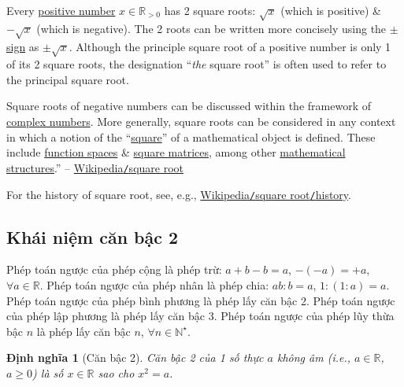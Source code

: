\documentclass{article}
\newtheorem{dinhnghia}{Định nghĩa}
\begin{document}
Every \href{https://en.wikipedia.org/wiki/Positive_number}{positive number} $x\in\mathbb{R}_{> 0}$ has 2 square roots: $\sqrt{x}$ (which is positive) \& $-\sqrt{x}$ (which is negative). The 2 roots can be written more concisely using the \href{https://en.wikipedia.org/wiki/Plus%E2%80%93minus_sign}{$\pm$ sign} as $\pm\sqrt{x}$. Although the principle square root of a positive number is only 1 of its 2 square roots, the designation ``\textit{the} square root'' is often used to refer to the principal square root.

Square roots of negative numbers can be discussed within the framework of \href{https://en.wikipedia.org/wiki/Complex_number}{complex numbers}. More generally, square roots can be considered in any context in which a notion of the ``\href{https://en.wikipedia.org/wiki/Square_(algebra)}{square}'' of a mathematical object is defined. These include \href{https://en.wikipedia.org/wiki/Function_space}{function spaces} \& \href{https://en.wikipedia.org/wiki/Square_matrices}{square matrices}, among other \href{https://en.wikipedia.org/wiki/Mathematical_structure}{mathematical structures}.'' -- \href{https://en.wikipedia.org/wiki/Square_root}{Wikipedia\texttt{/}square root}

For the history of square root, see, e.g., \href{https://en.wikipedia.org/wiki/Square_root#History}{Wikipedia\texttt{/}square root\texttt{/}history}.

\subsection{Khái niệm căn bậc 2}
Phép toán ngược của phép cộng là phép trừ: $a + b - b = a$, $-(-a) = +a$, $\forall a\in\mathbb{R}$. Phép toán ngược của phép nhân là phép chia: $ab:b = a$, $1:(1:a) = a$. Phép toán ngược của phép bình phương là phép lấy căn bậc 2. Phép toán ngược của phép lập phương là phép lấy căn bậc 3. Phép toán ngược của phép lũy thừa bậc $n$ là phép lấy căn bậc $n$, $\forall n\in\mathbb{N}^\star$.

\begin{dinhnghia}[Căn bậc 2]
	\emph{Căn bậc 2} của 1 số thực $a$ không âm (i.e., $a\in\mathbb{R}$, $a\ge0$) là số $x\in\mathbb{R}$ sao cho $x^2 = a$.
\end{dinhnghia}
\end{document}
